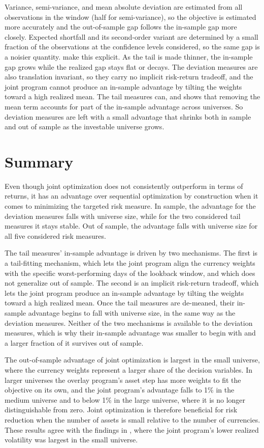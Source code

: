 Variance, semi-variance, and mean absolute deviation are estimated from all
observations in the window (half for semi-variance),
so the objective is estimated more accurately and the out-of-sample gap follows
the in-sample gap more closely. Expected shortfall and its second-order variant are determined 
by a small fraction of the observations at the confidence levels considered, so the same gap is a noisier quantity.  make this 
explicit. As the tail is made thinner, the in-sample gap grows while the realized gap stays flat or decays. The deviation measures are also translation invariant, so they carry 
no implicit risk-return tradeoff, and the joint program cannot produce an in-sample advantage by tilting the weights toward a high realized mean. The tail measures can, 
and  shows that removing the mean term accounts for part of the in-sample advantage across universes.
So deviation measures are left with a small advantage that shrinks both in sample and out of sample as the investable universe grows.

\section{Summary}\label{sec:conclusion-joint-vs-sequential}

Even though joint optimization does not consistently outperform in terms of returns, it has an advantage over sequential optimization by construction when it comes to minimizing the targeted 
risk measure. In sample, the advantage for the deviation measures falls with universe size, while for the two considered tail measures it stays stable. Out of sample, the advantage falls with 
universe size for all five considered risk measures. 

The tail measures' in-sample advantage is driven by two mechanisms. The first is a tail-fitting mechanism, which lets the joint program align the currency weights with the specific worst-performing
days of the lookback window, and which does not generalize out of sample. The second is an implicit risk-return tradeoff, which lets the joint program produce an in-sample advantage by tilting the 
weights toward a high realized mean. Once the tail measures are de-meaned, their in-sample advantage begins to fall with universe size, in the same way as the 
deviation measures. Neither of the two mechanisms is available to the deviation measures, which is why their in-sample advantage was smaller to begin with and a larger fraction of it survives out of 
sample.

The out-of-sample advantage of joint optimization is largest in the small universe, where the currency weights represent a larger share of the decision variables. In larger universes the overlay program's asset step has more weights to fit the objective on its own, and the joint program's advantage falls to 1\% in the medium universe and to below 1\% in the large universe, where it is no longer distinguishable from zero.  Joint optimization is therefore beneficial for risk reduction when the number of assets is small relative to the number of currencies. These results agree with the findings in , where the joint program's lower realized volatility was largest in the small universe.
